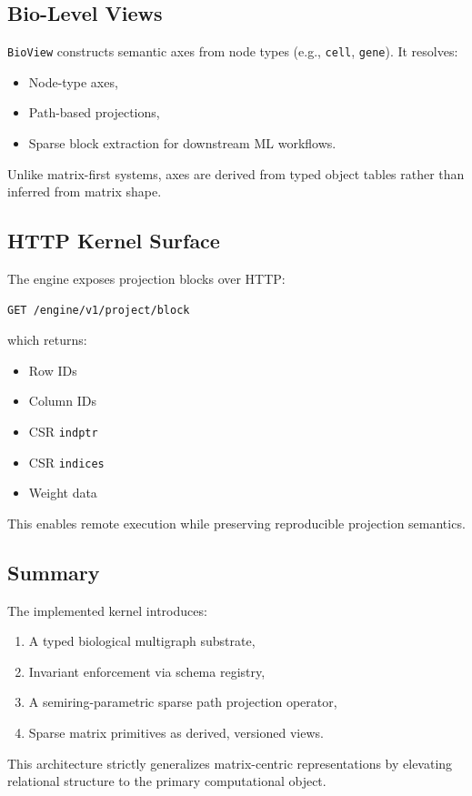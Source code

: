\documentclass[11pt]{article}
\begin{document}
\subsection{Bio-Level Views}

\texttt{BioView} constructs semantic axes from node types (e.g., \texttt{cell}, \texttt{gene}). It resolves:

\begin{itemize}
    \item Node-type axes,
    \item Path-based projections,
    \item Sparse block extraction for downstream ML workflows.
\end{itemize}

Unlike matrix-first systems, axes are derived from typed object tables rather than inferred from matrix shape.

\subsection{HTTP Kernel Surface}

The engine exposes projection blocks over HTTP:

\begin{verbatim}
GET /engine/v1/project/block
\end{verbatim}

which returns:

\begin{itemize}
    \item Row IDs
    \item Column IDs
    \item CSR \texttt{indptr}
    \item CSR \texttt{indices}
    \item Weight data
\end{itemize}

This enables remote execution while preserving reproducible projection semantics.

\subsection{Summary}

The implemented kernel introduces:

\begin{enumerate}
    \item A typed biological multigraph substrate,
    \item Invariant enforcement via schema registry,
    \item A semiring-parametric sparse path projection operator,
    \item Sparse matrix primitives as derived, versioned views.
\end{enumerate}

This architecture strictly generalizes matrix-centric representations by elevating relational structure to the primary computational object.
\end{document}
